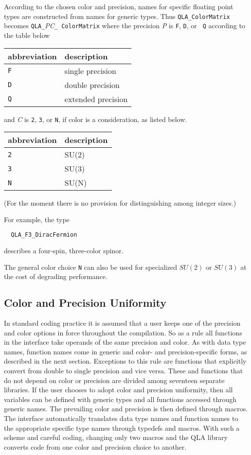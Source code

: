 \documentclass{article}
\newcommand{\tColorMatrix}{QLA\ttdash ColorMatrix }
\newcommand{\ttdash}{{\tt \_}}
\begin{document}
According to the chosen color and precision, names for specific
floating point types are constructed from names for generic types.
Thus {\tt \tColorMatrix} becomes {\tt QLA}\ttdash{\it PC}\ttdash{\tt
ColorMatrix} where the precision {\it P} is {\tt F}, {\tt D}, or {\tt
Q} according to the table below
\begin{center}
\begin{tabular}{|l|l|}
\hline
abbreviation & description \\
\hline
{\tt F}            & single precision \\
{\tt D}            & double precision \\
{\tt Q}            & extended precision \\
\hline
\end{tabular}
\end{center}
and {\it C} is {\tt 2}, {\tt 3}, or {\tt N}, if color is a
consideration, as listed below.
\begin{center}
\begin{tabular}{|l|l|}
\hline
abbreviation & description \\
\hline
{\tt 2}            & SU(2) \\
{\tt 3}            & SU(3) \\
{\tt N}            & SU(N) \\
\hline
\end{tabular}
\end{center}
(For the moment there is no provision for distinguishing among integer
sizes.)

For example, the type
%
\begin{verbatim}
  QLA_F3_DiracFermion
\end{verbatim}
%
describes a four-spin, three-color spinor.

The general color choice {\tt N} can also be used for specialized
$SU(2)$ or $SU(3)$ at the cost of degrading performance.

\subsection{Color and Precision Uniformity}

In standard coding practice it is assumed that a user keeps one of the
precision and color options in force throughout the compilation.  So
as a rule all functions in the interface take operands of the same
precision and color.  As with data type names, function names come in
generic and color- and precision-specific forms, as described in the
next section.  Exceptions to this rule are functions that explicitly
convert from double to single precision and vice versa.  These and
functions that do not depend on color or precision are divided among
seventeen separate libraries.  If the user chooses to adopt color and
precision uniformity, then all variables can be defined with generic
types and all functions accessed through generic names.  The
prevailing color and precision is then defined through macros.  The
interface automatically translates data type names and function names
to the appropriate specific type names through typedefs and macros.
With such a scheme and careful coding, changing only two macros and
the QLA library converts code from one color and precision choice to
another.
\end{document}
